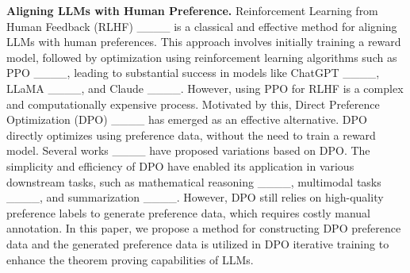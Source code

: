 \textbf{Aligning LLMs with Human Preference.} %
Reinforcement Learning from Human Feedback (RLHF) ____ is a classical and effective method for aligning LLMs with human preferences. This approach involves initially training a reward model, followed by optimization using reinforcement learning algorithms such as 
PPO ____, 
leading to substantial success in models like 
ChatGPT %
____, %
LLaMA ____, 
and Claude ____. 
However, using PPO for RLHF is a complex and computationally expensive process. Motivated by this, Direct Preference Optimization (DPO) ____ has emerged as an effective alternative. 
DPO directly optimizes using preference data, without the need to train a reward model. 
Several works ____  %
have proposed variations based on DPO. 
The simplicity and efficiency of DPO have enabled its application in various downstream tasks, such as 
mathematical reasoning ____, %
multimodal tasks ____, 
and 
summarization ____.  %
However, DPO still relies on high-quality preference labels to generate preference data, which requires costly manual annotation. 
In this paper, we propose a method for constructing DPO preference data and 
the generated preference data is utilized in DPO iterative training to enhance the theorem proving capabilities of LLMs.


